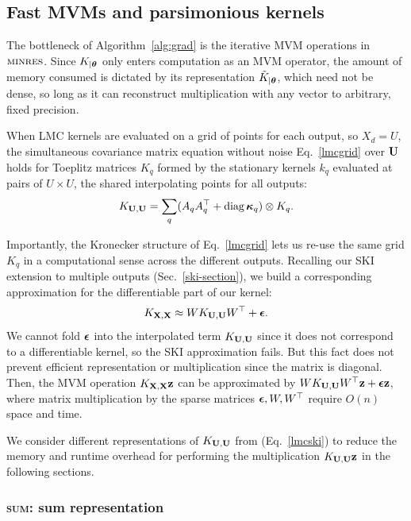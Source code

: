 \documentclass{article}
\begin{document}
\subsection{Fast MVMs and parsimonious kernels}\label{fast-mvm}

The bottleneck of Algorithm~\ref{alg:grad} is the iterative MVM operations in $\textsc{minres}$. Since $K_{|{\boldsymbol\theta}}$ only enters computation as an MVM operator, the amount of memory consumed is dictated by its representation $\tilde{K}_{|{\boldsymbol\theta}}$, which need not be dense, so long as it can reconstruct multiplication with any vector to arbitrary, fixed precision.

When LMC kernels are evaluated on a grid of points for each output, so $X_d=U$, the simultaneous covariance matrix equation without noise Eq.~\ref{lmcgrid} over $\textbf{U}$ holds for Toeplitz matrices $K_q$ formed by the stationary kernels $k_q$ evaluated at pairs of $U\times U$, the shared interpolating points for all outputs:
\begin{align}
  K_{\textbf{U},\textbf{U}}=\sum_q(A_qA_q^\top+\operatorname{diag}{\boldsymbol\kappa}_q)\otimes K_q\label{lmcgrid}.
\end{align}

Importantly, the Kronecker structure of Eq.~\ref{lmcgrid} lets us re-use the same grid $K_q$ in a computational sense across the different outputs. Recalling our SKI extension to multiple outputs (Sec.~\ref{ski-section}), we build a corresponding approximation for the differentiable part of our kernel:
\begin{align}
  K_{\textbf{X},\textbf{X}}\approx WK_{\textbf{U},\textbf{U}}W^\top+{\boldsymbol\epsilon}.\label{lmcski}
\end{align}
We cannot fold ${\boldsymbol\epsilon}$ into the interpolated term $K_{\textbf{U},\textbf{U}}$ since it does not correspond to a differentiable kernel, so the SKI approximation fails. But this fact does not prevent efficient representation or multiplication since the matrix is diagonal. Then, the MVM operation $K_{\textbf{X},\textbf{X}}\textbf{z}$ can be approximated by $WK_{\textbf{U},\textbf{U}}W^\top\textbf{z}+{\boldsymbol\epsilon}\textbf{z}$, where matrix multiplication by the sparse matrices ${\boldsymbol\epsilon}, W,W^\top$ require $O(n)$ space and time.

We consider different representations of $K_{\textbf{U},\textbf{U}}$ from (Eq.~\ref{lmcski}) to reduce the memory and runtime overhead for performing the multiplication $K_{\textbf{U},\textbf{U}}\textbf{z}$ in the following sections.

\subsubsection{\textsc{sum}: sum representation}
\end{document}
